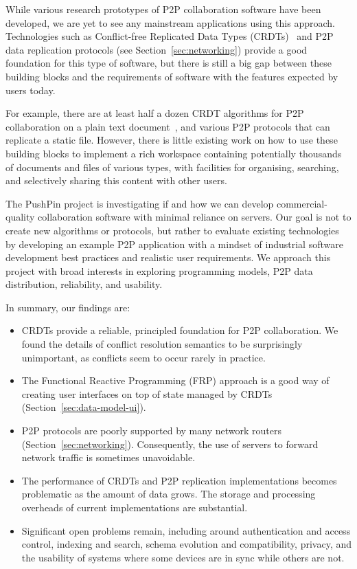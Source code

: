 \documentclass[sigplan,10pt]{acmart}
\begin{document}
While various research prototypes of P2P collaboration software have been developed, we are yet to see any mainstream applications using this approach.
Technologies such as Conflict-free Replicated Data Types (CRDTs)~\cite{Shapiro:2011un} and P2P data replication protocols (see Section~\ref{sec:networking}) provide a good foundation for this type of software, but there is still a big gap between these building blocks and the requirements of software with the features expected by users today.

For example, there are at least half a dozen CRDT algorithms for P2P collaboration on a plain text document~\cite{Kleppmann:2019iu}, and various P2P protocols that can replicate a static file.
However, there is little existing work on how to use these building blocks to implement a rich workspace containing potentially thousands of documents and files of various types, with facilities for organising, searching, and selectively sharing this content with other users.

The PushPin project is investigating if and how we can develop commercial-quality collaboration software with minimal reliance on servers.
Our goal is not to create new algorithms or protocols, but rather to evaluate existing technologies by developing an example P2P application with a mindset of industrial software development best practices and realistic user requirements.
We approach this project with broad interests in exploring programming models, P2P data distribution, reliability, and usability.

In summary, our findings are:
\begin{itemize}
    \item CRDTs provide a reliable, principled foundation for P2P collaboration.
    We found the details of conflict resolution semantics to be surprisingly unimportant, as conflicts seem to occur rarely in practice.
    \item The Functional Reactive Programming (FRP) approach is a good way of creating user interfaces on top of state managed by CRDTs (Section~\ref{sec:data-model-ui}).
    \item P2P protocols are poorly supported by many network routers (Section~\ref{sec:networking}).
    Consequently, the use of servers to forward network traffic is sometimes unavoidable.
    \item The performance of CRDTs and P2P replication implementations becomes problematic as the amount of data grows. The storage and processing overheads of current implementations are substantial.
    \item Significant open problems remain, including around authentication and access control, indexing and search, schema evolution and compatibility, privacy, and the usability of systems where some devices are in sync while others are not.
\end{itemize}
\end{document}
